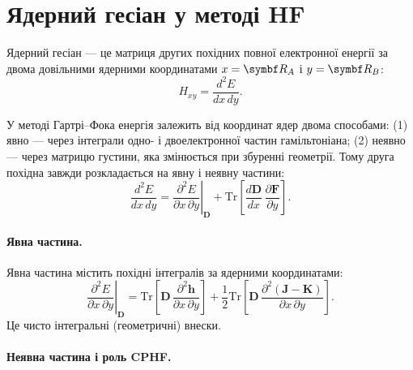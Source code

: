 \documentclass{PySCFBook}
\begin{document}
\section{Ядерний гесіан у методі HF}

Ядерний гесіан --- це матриця других похідних повної електронної
енергії за двома довільними ядерними координатами $x=\vect{R}_A$ і $y=\vect{R}_B$:
\begin{equation}\label{eq:HF_Hessian_def}
H_{xy}
=
\frac{d^2 E}{dx\,dy}.
\end{equation}

У методі Гартрі--Фока енергія залежить від координат ядер двома способами:
(1) явно — через інтеграли одно- і двоелектронної частин гамільтоніана;
(2) неявно — через матрицю густини, яка змінюється при збуренні геометрії.
Тому друга похідна завжди розкладається на явну і неявну частини:
\begin{equation}\label{eq:HF_Hessian_split}
\frac{d^2E}{dx\,dy}
=
\left.
\frac{\partial^2E}{\partial x\,\partial y}
\right|_{\mathbf D}
+
\mathrm{Tr}
\!\left[
\frac{d\mathbf D}{dx}\,
\frac{\partial \mathbf F}{\partial y}
\right].
\end{equation}

\paragraph{Явна частина.}

Явна частина містить похідні інтегралів за ядерними координатами:
\begin{equation}
\left.
\frac{\partial^2E}{\partial x\,\partial y}
\right|_{\mathbf D}
=
\mathrm{Tr}\!\left[
\mathbf D\,\frac{\partial^2 \mathbf h}{\partial x\,\partial y}
\right]
+
\frac12
\mathrm{Tr}\!\left[
\mathbf D\,\frac{\partial^2 (\mathbf J - \mathbf K)}{\partial x\,\partial y}
\right].
\end{equation}
Це чисто інтегральні (геометричні) внески.

\paragraph{Неявна частина і роль CPHF.}
\end{document}
